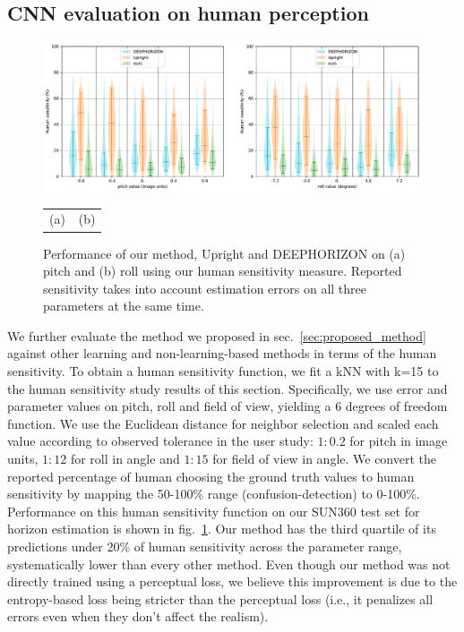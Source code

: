 \subsection{CNN evaluation on human perception}
\label{sec:cnn-evaluation-perception}

\begin{figure}
\centering
\includegraphics[width=\linewidth]{figures/method/human_sensitivity_performance_SUN360.pdf}
\begin{tabular}{p{0.5\linewidth}p{0.5\linewidth}}
\hspace{1.5cm}(a) & \hspace{1.3cm}(b)
\end{tabular}
\caption[Performance on human sensitivity measure]{Performance of our method, Upright and DEEPHORIZON on (a) pitch and (b) roll using our human sensitivity measure. Reported sensitivity takes into account estimation errors on all three parameters at the same time.}
\label{fig:method_human_performance}
\end{figure}


We further evaluate the method we proposed in sec.~\ref{sec:proposed_method} against other learning and non-learning-based methods in terms of the human sensitivity. To obtain a human sensitivity function, we fit a kNN with k=15 to the human sensitivity study results of this section. Specifically, we use error and parameter values on pitch, roll and field of view, yielding a 6 degrees of freedom function. We use the Euclidean distance for neighbor selection and scaled each value according to observed tolerance in the user study: $1{:}0.2$ for pitch in image units, $1{:}12$ for roll in angle and $1{:}15$ for field of view in angle. We convert the reported percentage of human choosing the ground truth values to human sensitivity by mapping the 50-100\% range (confusion-detection) to 0-100\%. Performance on this human sensitivity function on our SUN360 test set for horizon estimation is shown in fig.~\ref{fig:method_human_performance}. Our method has the third quartile of its predictions under 20\% of human sensitivity across the parameter range, systematically lower than every other method. Even though our method was not directly trained using a perceptual loss, we believe this improvement is due to the entropy-based loss being stricter than the perceptual loss (i.e., it penalizes all errors even when they don't affect the realism).

